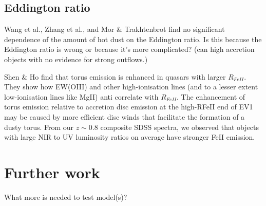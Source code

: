 \subsection{Eddington ratio}

Wang et al., Zhang et al., and Mor \& Trakhtenbrot find no significant dependence of the amount of hot dust on the Eddington ratio. 
Is this because the Eddington ratio is wrong or because it's more complicated? (can high accretion objects with no evidence for strong outflows.)

Shen \& Ho find that torus emission is enhanced in quasars with larger $R_{FeII}$. 
They show how EW(OIII) and other high-ionisation lines (and to a lesser extent low-ionisation lines like MgII) anti correlate with $R_{FeII}$. 
The enhancement of torus emission relative to accretion disc emission at the high-RFeII end of EV1 may be caused by more efficient disc winds that facilitate the formation of a dusty torus. 
From our $z\sim0.8$ composite SDSS spectra, we observed that objects with large NIR to UV luminosity ratios on average have stronger FeII emission. 

\section{Further work}

What more is needed to test model(s)?  
